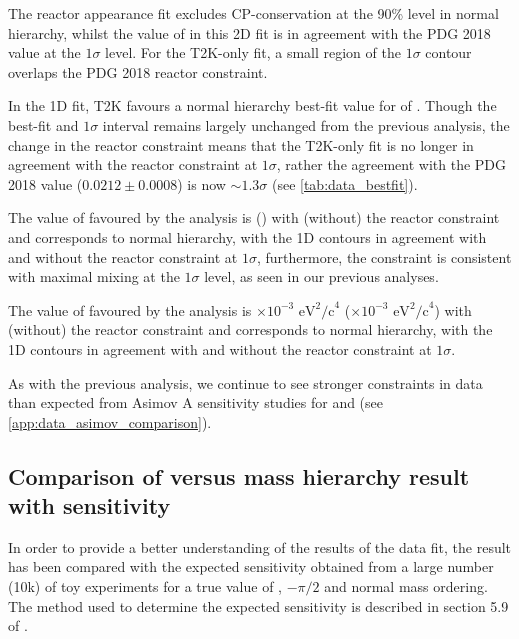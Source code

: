 The reactor appearance fit excludes CP-conservation at the 90\% level in normal hierarchy, whilst the value of \ssqthonethree in this 2D fit is in agreement with the PDG 2018 value at the $1\sigma$ level. For the T2K-only fit, a small region of the $1\sigma$ contour overlaps the PDG 2018 reactor constraint.

In the 1D fit, T2K favours a normal hierarchy best-fit value for \ssqthonethree of \BestFitMixingOneThreewoRC. Though the best-fit and $1\sigma$ interval remains largely unchanged from the previous analysis, the change in the reactor constraint means that the T2K-only fit is no longer in agreement with the reactor constraint at $1\sigma$, rather the agreement with the PDG 2018 value ($0.0212 \pm 0.0008$) is now $\sim1.3\sigma$ (see \cref{tab:data_bestfit}).

The value of \ssqthtwothree favoured by the analysis is \BestFitMixingTwoThreewRC (\BestFitMixingTwoThreewoRC) with (without) the reactor constraint and corresponds to normal hierarchy, with the 1D contours in agreement with and without the reactor constraint at $1 \sigma$, furthermore, the constraint is consistent with maximal mixing at the $1\sigma$ level, as seen in our previous analyses.

The value of \dmsqtwothree favoured by the analysis is \BestFitDmTwoThreewRC $\times 10^{-3}\text{ eV}^2\text{/c}^4$ (\BestFitDmTwoThreewoRC$\times 10^{-3}\text{ eV}^2\text{/c}^4$) with (without) the reactor constraint and corresponds to normal hierarchy, with the 1D contours in agreement with and without the reactor constraint at $1 \sigma$.

As with the previous analysis, we continue to see stronger constraints in data than expected from Asimov A sensitivity studies for \deltacp and \ssqthtwothree (see \cref{app:data_asimov_comparison}).

\subsection {Comparison of \deltacp versus mass hierarchy result with sensitivity}
\label{sec:results:brazilian}

In order to provide a better understanding of the results of the \RunPeriod data fit, the result has been compared with the expected sensitivity obtained from a large number (10k) of toy experiments for a true value of \deltacp, $-\pi/2$ and normal mass ordering. The method used to determine the expected sensitivity is described in section 5.9 of \cite{OurRun18JointAnalysis3Flavour}.

